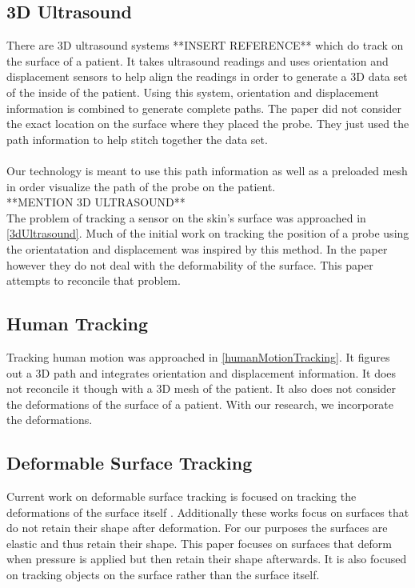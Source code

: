 \subsection{3D Ultrasound}

There are 3D ultrasound systems **INSERT REFERENCE** which do track on the surface of a patient. It takes ultrasound readings and uses orientation and displacement sensors to help align the readings in order to generate a 3D data set of the inside of the patient. Using this system, orientation and displacement information is combined to generate complete paths. The paper did not consider the exact location on the surface where they placed the probe. They just used the path information to help stitch together the data set. \\
\\
Our technology is meant to use this path information as well as a preloaded mesh in order visualize the path of the probe on the patient. \\
**MENTION 3D ULTRASOUND**\\

The problem of tracking a sensor on the skin's surface was approached in \ref{3dUltrasound}. Much of the initial work on tracking the position of a probe using the orientatation and displacement was inspired by this method. In the paper however they do not deal with the deformability of the surface. This paper attempts to reconcile that problem.\\

\subsection{Human Tracking}

Tracking human motion was approached in \ref{humanMotionTracking}. It figures out a 3D path and integrates orientation and displacement information. It does not reconcile it though with a 3D mesh of the patient. It also does not consider the deformations of the surface of a patient. With our research, we incorporate the deformations. 

\subsection{Deformable Surface Tracking}

Current work on deformable surface tracking is focused on tracking the deformations of the surface itself \cite{deformableobjecttracking,convexopt}. Additionally these works focus on surfaces that do not retain their shape after deformation. For our purposes the surfaces are elastic and thus retain their shape. This paper focuses on surfaces that deform when pressure is applied but then retain their shape afterwards. It is also focused on tracking objects on the surface rather than the surface itself.\\
\\

